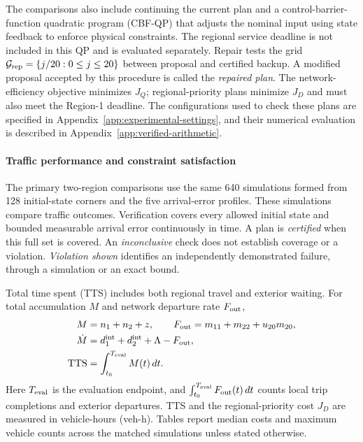 \documentclass[final]{cas-sc}
\theoremstyle{definition}
\theoremstyle{plain}
\theoremstyle{definition}
\theoremstyle{plain}
\newcommand{\appref}[1]{Appendix~\ref{#1}}
\begin{document}
The comparisons also include continuing the current plan and a
control-barrier-function quadratic program (CBF-QP) that adjusts the
nominal input using state feedback to enforce physical constraints.
The regional service deadline is not included in this QP and is evaluated
separately. Repair tests the grid $\mathcal G_{\rm rep}=\{j/20:0\le j\le20\}$
between proposal and certified backup. A modified proposal accepted by
this procedure is called the \emph{repaired plan}. The network-efficiency objective
minimizes $J_Q$; regional-priority plans minimize $J_D$ and must also
meet the Region-1 deadline. The configurations used to check these plans
are specified in \appref{app:experimental-settings}, and their numerical
evaluation is described in \appref{app:verified-arithmetic}.

\paragraph{Traffic performance and constraint satisfaction}
The primary two-region comparisons use the same 640 simulations formed
from 128 initial-state corners and the five arrival-error profiles.
These simulations compare traffic outcomes. Verification covers every
allowed initial state and bounded measurable arrival error continuously
in time. A plan is \emph{certified} when this full set is covered. An
\emph{inconclusive} check does not establish coverage or a violation.
\emph{Violation shown} identifies an independently demonstrated failure,
through a simulation or an exact bound.

Total time spent (TTS) includes both regional travel and exterior waiting.
For total accumulation $M$ and network departure rate $F_{\rm out}$,
\begin{equation}
\begin{aligned}
M&=n_1+n_2+z,\qquad F_{\rm out}=m_{11}+m_{22}+u_{20}m_{20},\\
\dot M&=d_1^{\rm int}+d_2^{\rm int}+\Lambda-F_{\rm out},\\
\mathrm{TTS}&=\int_{t_0}^{T_{\rm eval}}M(t)\,dt.
\end{aligned}
\label{eq:new-conservation}
\end{equation}
Here $T_{\rm eval}$ is the evaluation endpoint, and
$\int_{t_0}^{T_{\rm eval}}F_{\rm out}(t)\,dt$ counts local trip
completions and exterior departures. TTS and the regional-priority
cost $J_D$ are measured in vehicle-hours (veh-h). Tables report median
costs and maximum vehicle counts across the matched simulations unless
stated otherwise.
\end{document}
